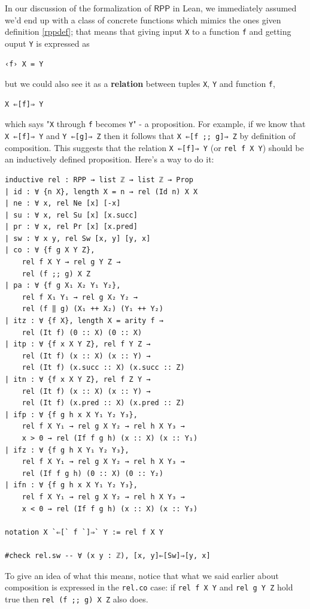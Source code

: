 \documentclass[oneside]{book}
\theoremstyle{definition}
\theoremstyle{remark}
\theoremstyle{plain}
\newcommand{\RPP}{\mathsf{RPP}}
\begin{document}
In our discussion of the formalization of $\RPP$ in Lean,
we immediately assumed we'd end up with a class of concrete functions
which mimics the ones given definition \ref{rppdef};
that means that giving input \lstinline{X} to a function \lstinline{f} and getting ouput \lstinline{Y}
is expressed as
\begin{lstlisting}
‹f› X = Y
\end{lstlisting}
but we could also see it as a \textbf{relation} \cite{Pierce:SF1} between tuples \lstinline{X}, \lstinline{Y} and function \lstinline{f},
\begin{lstlisting}
X ⇐[f]⇒ Y
\end{lstlisting}
which says "\lstinline{X} through \lstinline{f} becomes \lstinline{Y}" - a proposition.
For example, if we know that \lstinline{X ⇐[f]⇒ Y} and \lstinline{Y ⇐[g]⇒ Z} then it follows that
\lstinline{X ⇐[f ;; g]⇒ Z} by definition of composition.
This suggests that the relation \lstinline{X ⇐[f]⇒ Y} (or \lstinline{rel f X Y}) should be an inductively defined proposition.
Here's a way to do it:
\begin{lstlisting}[basicstyle=\small]
inductive rel : RPP → list ℤ → list ℤ → Prop
| id : ∀ {n X}, length X = n → rel (Id n) X X
| ne : ∀ x, rel Ne [x] [-x]
| su : ∀ x, rel Su [x] [x.succ]
| pr : ∀ x, rel Pr [x] [x.pred]
| sw : ∀ x y, rel Sw [x, y] [y, x]
| co : ∀ {f g X Y Z},
    rel f X Y → rel g Y Z →
    rel (f ;; g) X Z
| pa : ∀ {f g X₁ X₂ Y₁ Y₂},
    rel f X₁ Y₁ → rel g X₂ Y₂ →
    rel (f ‖ g) (X₁ ++ X₂) (Y₁ ++ Y₂)
| itz : ∀ {f X}, length X = arity f →
    rel (It f) (0 :: X) (0 :: X)
| itp : ∀ {f x X Y Z}, rel f Y Z →
    rel (It f) (x :: X) (x :: Y) →
    rel (It f) (x.succ :: X) (x.succ :: Z)
| itn : ∀ {f x X Y Z}, rel f Z Y →
    rel (It f) (x :: X) (x :: Y) →
    rel (It f) (x.pred :: X) (x.pred :: Z)
| ifp : ∀ {f g h x X Y₁ Y₂ Y₃},
    rel f X Y₁ → rel g X Y₂ → rel h X Y₃ →
    x > 0 → rel (If f g h) (x :: X) (x :: Y₁)
| ifz : ∀ {f g h X Y₁ Y₂ Y₃},
    rel f X Y₁ → rel g X Y₂ → rel h X Y₃ →
    rel (If f g h) (0 :: X) (0 :: Y₂)
| ifn : ∀ {f g h x X Y₁ Y₂ Y₃},
    rel f X Y₁ → rel g X Y₂ → rel h X Y₃ →
    x < 0 → rel (If f g h) (x :: X) (x :: Y₃)

notation X `⇐[` f `]⇒` Y := rel f X Y

#check rel.sw -- ∀ (x y : ℤ), [x, y]⇐[Sw]⇒[y, x]
\end{lstlisting}
To give an idea of what this means, notice that what we said earlier about composition is
expressed in the \lstinline{rel.co} case: if \lstinline{rel f X Y} and \lstinline{rel g Y Z} hold true then
\lstinline{rel (f ;; g) X Z} also does.
\end{document}

